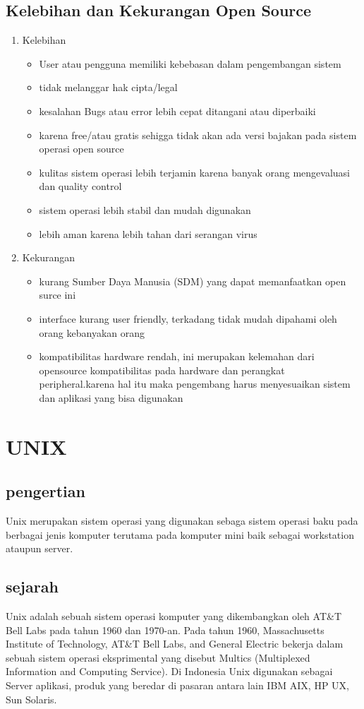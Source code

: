 \subsection{Kelebihan dan Kekurangan Open Source}
\begin{enumerate}
\item Kelebihan
\begin{itemize}
\item User atau pengguna memiliki kebebasan dalam pengembangan sistem
\item tidak melanggar hak cipta/legal
\item kesalahan Bugs atau error lebih cepat ditangani atau diperbaiki
\item karena free/atau gratis sehigga tidak akan ada versi bajakan pada sistem operasi open source
\item kulitas sistem operasi lebih terjamin karena banyak orang mengevaluasi dan quality control
\item sistem operasi lebih stabil dan mudah digunakan
\item lebih aman karena lebih tahan dari serangan virus
\end{itemize}

\item Kekurangan
\begin{itemize}
\item kurang Sumber Daya Manusia (SDM) yang dapat memanfaatkan open surce ini
\item interface kurang user friendly, terkadang tidak mudah dipahami oleh orang kebanyakan orang
\item kompatibilitas hardware rendah, ini merupakan kelemahan dari opensource kompatibilitas pada hardware dan perangkat peripheral.karena hal itu maka pengembang harus menyesuaikan sistem dan aplikasi yang bisa digunakan
\end{itemize}

\end{enumerate}

\section{UNIX}
\subsection{pengertian}
	Unix merupakan sistem operasi yang digunakan sebaga sistem operasi baku pada berbagai jenis komputer terutama pada komputer mini baik sebagai workstation ataupun server.
\subsection{sejarah}
	Unix adalah sebuah sistem operasi komputer yang dikembangkan oleh AT\&T Bell Labs pada tahun 1960 dan 1970-an. Pada tahun 1960, Massachusetts Institute of Technology, AT\&T Bell Labs, and General Electric bekerja dalam sebuah sistem operasi eksprimental yang disebut Multics (Multiplexed Information and Computing Service).
	Di Indonesia Unix digunakan sebagai Server aplikasi, produk yang beredar di pasaran antara lain IBM AIX, HP UX, Sun Solaris.
